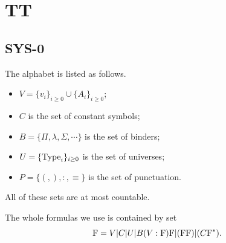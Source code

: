 \chapter{TT}

\section{SYS-0}

The alphabet is listed as follows.

\begin{itemize}
  \item $V = \{v_i\}_{i \geq 0} \cup \{ A_i \}_{i \geq 0}$;
  \item $C$ is the set of constant symbols;
  \item $B = \{\Pi, \lambda, \Sigma, \cdots \}$ is the set of binders;
  \item $U = \{\mathrm{Type}_i\}_{i \geq 0}$ is the set of universes;
  \item $P = \{ (, ), : , \equiv \}$ is the set of punctuation.
\end{itemize}
All of these sets are at most countable. 


The whole formulas we use is contained by set
\[
  \mathrm{F} = V | C | U | B(V : \mathrm{F})\mathrm{F} | (\mathrm{F} \mathrm{F}) | (C \mathrm{F}^*).
\]


